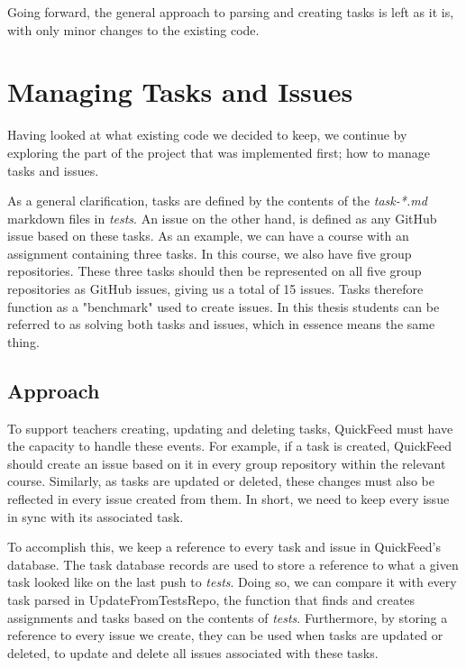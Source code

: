 Going forward, the general approach to parsing and creating tasks is left as it is, with only minor changes to the existing code.

\section{Managing Tasks and Issues}

Having looked at what existing code we decided to keep, we continue by exploring the part of the project that was implemented first; how to manage tasks and issues.

As a general clarification, tasks are defined by the contents of the \textit{task-*.md} markdown files in \textit{tests}.
An issue on the other hand, is defined as any GitHub issue based on these tasks.
As an example, we can have a course with an assignment containing three tasks.
In this course, we also have five group repositories.
These three tasks should then be represented on all five group repositories as GitHub issues, giving us a total of 15 issues.
Tasks therefore function as a "benchmark" used to create issues.
In this thesis students can be referred to as solving both tasks and issues, which in essence means the same thing.

\subsection{Approach}

To support teachers creating, updating and deleting tasks, QuickFeed must have the capacity to handle these events.
For example, if a task is created, QuickFeed should create an issue based on it in every group repository within the relevant course.
Similarly, as tasks are updated or deleted, these changes must also be reflected in every issue created from them.
In short, we need to keep every issue in sync with its associated task.

To accomplish this, we keep a reference to every task and issue in QuickFeed's database.
The task database records are used to store a reference to what a given task looked like on the last push to \textit{tests}.
Doing so, we can compare it with every task parsed in UpdateFromTestsRepo, the function that finds and creates assignments and tasks based on the contents of \textit{tests}.
Furthermore, by storing a reference to every issue we create, they can be used when tasks are updated or deleted, to update and delete all issues associated with these tasks.

